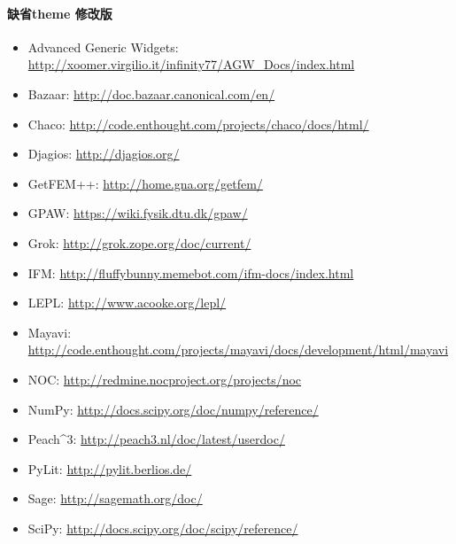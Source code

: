 \documentclass[letterpaper,10pt,english]{sphinxmanual}
\begin{document}
\paragraph{缺省theme 修改版}
\label{jupyter/sphinx_quickstart:_u7f3a_u7701theme-_u4fee_u6539_u7248}\begin{itemize}
\item {} 
Advanced Generic Widgets:
\url{http://xoomer.virgilio.it/infinity77/AGW\_Docs/index.html}

\item {} 
Bazaar: \url{http://doc.bazaar.canonical.com/en/}

\item {} 
Chaco: \url{http://code.enthought.com/projects/chaco/docs/html/}

\item {} 
Djagios: \url{http://djagios.org/}

\item {} 
GetFEM++: \url{http://home.gna.org/getfem/}

\item {} 
GPAW: \url{https://wiki.fysik.dtu.dk/gpaw/}

\item {} 
Grok: \url{http://grok.zope.org/doc/current/}

\item {} 
IFM: \url{http://fluffybunny.memebot.com/ifm-docs/index.html}

\item {} 
LEPL: \url{http://www.acooke.org/lepl/}

\item {} 
Mayavi:
\url{http://code.enthought.com/projects/mayavi/docs/development/html/mayavi}

\item {} 
NOC: \url{http://redmine.nocproject.org/projects/noc}

\item {} 
NumPy: \url{http://docs.scipy.org/doc/numpy/reference/}

\item {} 
Peach\textasciicircum{}3: \url{http://peach3.nl/doc/latest/userdoc/}

\item {} 
PyLit: \url{http://pylit.berlios.de/}

\item {} 
Sage: \url{http://sagemath.org/doc/}

\item {} 
SciPy: \url{http://docs.scipy.org/doc/scipy/reference/}


\end{itemize}
\end{document}
